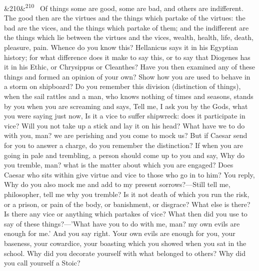 \documentclass[12pt]{article}
\newcommand{\para}[1][]{\par\noindent\ifx&#1&\else\textsuperscript{\footnotesize #1}~\fi}
\begin{document}
\para[210] Of things some are good, some are bad, and others are indifferent. The good then are the virtues and the things which partake of the virtues: the bad are the vices, and the things which partake of them; and the indifferent are the things which lie between the virtues and the vices, wealth, health, life, death, pleasure, pain. Whence do you know this? Hellanicus says it in his Egyptian history; for what difference does it make to say this, or to say that Diogenes has it in his Ethic, or Chrysippus or Cleanthes? Have you then examined any of these things and formed an opinion of your own? Show how you are used to behave in a storm on shipboard? Do you remember this division (distinction of things), when the sail rattles and a man, who knows nothing of times and seasons, stands by you when you are screaming and says, Tell me, I ask you by the Gods, what you were saying just now, Is it a vice to suffer shipwreck: does it participate in vice? Will you not take up a stick and lay it on his head? What have we to do with you, man? we are perishing and you come to mock us? But if Caesar send for you to answer a charge, do you remember the distinction? If when you are going in pale and trembling, a person should come up to you and say, Why do you tremble, man? what is the matter about which you are engaged? Does Caesar who sits within give virtue and vice to those who go in to him? You reply, Why do you also mock me and add to my present sorrows?—Still tell me, philosopher, tell me why you tremble? Is it not death of which you run the risk, or a prison, or pain of the body, or banishment, or disgrace? What else is there? Is there any vice or anything which partakes of vice? What then did you use to say of these things?—'What have you to do with me, man? my own evils are enough for me.' And you say right. Your own evils are enough for you, your baseness, your cowardice, your boasting which you showed when you sat in the school. Why did you decorate yourself with what belonged to others? Why did you call yourself a Stoic?
\end{document}
